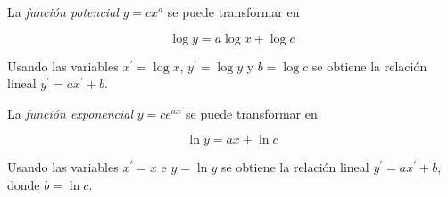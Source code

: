 \documentclass{article}
\begin{document}
La \emph{función potencial} $y=cx^a$ se puede transformar en 

\[ \log y = a\log x + \log c \]

Usando las variables $x^\prime = \log x$, $y^\prime = \log y$ y $b = \log c$
se obtiene la relación lineal $y^\prime = ax^\prime + b$.

La \emph{función exponencial} $y = ce^{ax}$ se puede transformar en 

\[ \ln y = ax + \ln c \]

Usando las variables $x^\prime = x$ e $y = \ln y$ se obtiene la relación lineal
$y^\prime = ax^\prime + b$, donde $b = \ln c$.
\end{document}
